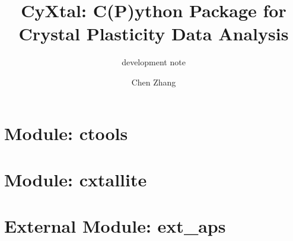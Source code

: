 \documentclass[12pt]{scrartcl}
\begin{document}
\title{CyXtal: C(P)ython Package for Crystal Plasticity Data Analysis}
\subtitle{development note}
\author{Chen Zhang}
\maketitle

\section{Module: ctools}

\section{Module: cxtallite}

\section{External Module: ext\_aps}
\end{document}
